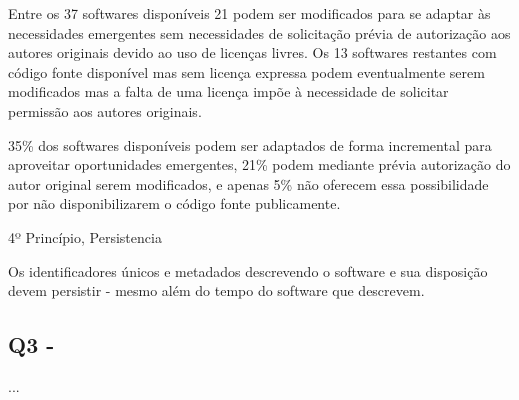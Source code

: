 Entre os 37 softwares disponíveis 21 podem ser modificados para se adaptar às
necessidades emergentes sem necessidades de solicitação prévia de autorização
aos autores originais devido ao uso de licenças livres. Os 13 softwares
restantes com código fonte disponível mas sem licença expressa podem
eventualmente serem modificados mas a falta de uma licença impõe à necessidade
de solicitar permissão aos autores originais.

35\% dos softwares disponíveis podem ser adaptados de forma incremental para
aproveitar oportunidades emergentes, 21\% podem mediante prévia autorização do
autor original serem modificados, e apenas 5\% não oferecem essa possibilidade
por não disponibilizarem o código fonte publicamente.

4º Princípio, Persistencia

Os identificadores únicos e metadados descrevendo o software e sua disposição
devem persistir - mesmo além do tempo do software que descrevem.



\subsection{Q3 - \QuestaoTres}

...


